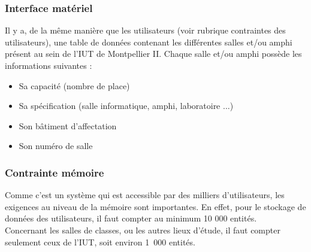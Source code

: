 \documentclass[a4paper, 11pt]{article}
\begin{document}
        \subsubsection{ Interface matériel}
        Il y a, de la même manière que les utilisateurs (voir rubrique contraintes des utilisateurs), une table de données contenant les différentes salles et/ou amphi présent au sein de l'IUT de Montpellier II. Chaque salle et/ou amphi possède les informations suivantes :
        \begin{itemize}
        \item Sa capacité (nombre de place)
        \item Sa spécification (salle informatique, amphi, laboratoire ...)
        \item Son bâtiment d'affectation
        \item Son numéro de salle
        \end{itemize}
        \subsubsection{ Contrainte mémoire}
        Comme c'est un système qui est accessible par des milliers d'utilisateurs, les exigences au niveau de la mémoire sont importantes. En effet, pour le stockage de données des utilisateurs, il faut compter au minimum 10 000 entités.\\
        Concernant les salles de classes, ou les autres lieux d'étude, il faut compter seulement ceux de l'IUT, soit environ 1~000 entités.
\end{document}
